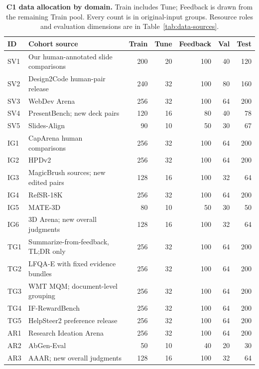 \begin{table}[!htbp]
\caption{\textbf{C1 data allocation by domain.} Train includes Tune; Feedback is drawn from the remaining Train pool. Every count is in original-input groups. Resource roles and evaluation dimensions are in Table~\ref{tab:data-sources}.}
\label{tab:cohort-allocation}
\centering\small
\setlength{\tabcolsep}{3pt}
\begin{tabularx}{\linewidth}{@{}lYrrrrr@{}}
\toprule
ID & Cohort source & Train & Tune & Feedback & Val & Test\\
\midrule
SV1 & Our human-annotated slide comparisons & 200 & 20 & 100 & 40 & 120\\
SV2 & Design2Code human-pair release & 240 & 32 & 100 & 80 & 160\\
SV3 & WebDev Arena & 256 & 32 & 100 & 64 & 200\\
SV4 & PresentBench; new deck pairs & 120 & 16 & 80 & 40 & 78\\
SV5 & Slides-Align & 90 & 10 & 50 & 30 & 67\\
IG1 & CapArena human comparisons & 256 & 32 & 100 & 64 & 200\\
IG2 & HPDv2 & 256 & 32 & 100 & 64 & 200\\
IG3 & MagicBrush sources; new edited pairs & 128 & 16 & 100 & 32 & 64\\
IG4 & RefSR-18K & 256 & 32 & 100 & 64 & 200\\
IG5 & MATE-3D & 80 & 10 & 50 & 30 & 50\\
IG6 & 3D Arena; new overall judgments & 128 & 16 & 100 & 32 & 64\\
TG1 & Summarize-from-feedback, TL;DR only & 256 & 32 & 100 & 64 & 200\\
TG2 & LFQA-E with fixed evidence bundles & 256 & 32 & 100 & 64 & 200\\
TG3 & WMT MQM; document-level grouping & 256 & 32 & 100 & 64 & 200\\
TG4 & IF-RewardBench & 256 & 32 & 100 & 64 & 200\\
TG5 & HelpSteer2 preference release & 256 & 32 & 100 & 64 & 200\\
AR1 & Research Ideation Arena & 256 & 32 & 100 & 64 & 200\\
AR2 & AbGen-Eval & 50 & 10 & 40 & 20 & 30\\
AR3 & AAAR; new overall judgments & 128 & 16 & 100 & 32 & 64\\
\bottomrule
\end{tabularx}
\end{table}

